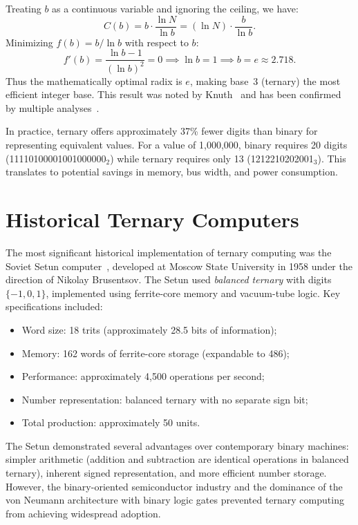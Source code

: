 \documentclass[12pt,a4paper,twoside]{book}
\theoremstyle{trinarytheorem}
\theoremstyle{trinarydefinition}
\begin{document}
Treating $b$ as a continuous variable and ignoring the ceiling, we have:
\[
C(b) = b \cdot \frac{\ln N}{\ln b} = (\ln N) \cdot \frac{b}{\ln b}.
\]
Minimizing $f(b) = b / \ln b$ with respect to $b$:
\[
f'(b) = \frac{\ln b - 1}{(\ln b)^2} = 0 \implies \ln b = 1 \implies b = e \approx 2.718.
\]
Thus the mathematically optimal radix is $e$, making base~3 (ternary) the most efficient
integer base. This result was noted by Knuth~\cite{knuth1997art} and has been confirmed
by multiple analyses~\cite{hurts1989comparison}.

In practice, ternary offers approximately 37\% fewer digits than binary for representing
equivalent values. For a value of 1,000,000, binary requires 20 digits
(11110100001001000000$_2$) while ternary requires only 13 (1212210202001$_3$). This
translates to potential savings in memory, bus width, and power consumption.

\section{Historical Ternary Computers}

The most significant historical implementation of ternary computing was the Soviet Setun
computer~\cite{brusentsov1965setun}, developed at Moscow State University in 1958 under
the direction of Nikolay Brusentsov. The Setun used \emph{balanced ternary} with digits
$\{-1,0,1\}$, implemented using ferrite-core memory and vacuum-tube logic. Key
specifications included:

\begin{itemize}
    \item Word size: 18 trits (approximately 28.5 bits of information);
    \item Memory: 162 words of ferrite-core storage (expandable to 486);
    \item Performance: approximately 4,500 operations per second;
    \item Number representation: balanced ternary with no separate sign bit;
    \item Total production: approximately 50 units.
\end{itemize}

The Setun demonstrated several advantages over contemporary binary machines: simpler
arithmetic (addition and subtraction are identical operations in balanced ternary),
inherent signed representation, and more efficient number storage. However, the
binary-oriented semiconductor industry and the dominance of the von Neumann architecture
with binary logic gates prevented ternary computing from achieving widespread adoption.
\end{document}
